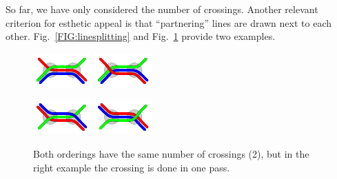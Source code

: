 \documentclass{llncs}
\begin{document}
So far, we have only considered the number of crossings.
Another relevant criterion for esthetic appeal is that ``partnering'' lines are drawn next to each other.
Fig.~\ref{FIG:linesplitting} and Fig.~\ref{FIG:linesplitting2} provide two examples.
%
\begin{figure}[t]
\centering
\begin{minipage}{.48\textwidth}
  \centering
	\includegraphics[trim={2.25 0 2.25 0},clip,angle=270,origin=c,width=.25\textwidth]{render_examples/splitting_example_nonopt.pdf}\hspace{19pt}
	\includegraphics[trim={2.25 0 2.25 0},clip,angle=270,origin=c,width=.25\textwidth]{render_examples/splitting_example.pdf}
	\caption{Crossings are minimized in the left example (1), but the right example with 2 crossings better indicates line pairings.}
	\label{FIG:linesplitting}
\end{minipage}%
\hfill
\begin{minipage}{.48\textwidth}
  \centering
	\includegraphics[trim={2.25 0 2.25 0},clip,angle=90,origin=c,width=.25\textwidth]{render_examples/splitting_example2_nonopt.pdf}\hspace{19pt}
	\includegraphics[trim={2.25 0 2.25 0},clip,angle=90,origin=c,width=.25\textwidth]{render_examples/splitting_example2.pdf}
	\caption{Both orderings have the same number of crossings (2), but in the right example the
crossing is done in one pass.}
	\label{FIG:linesplitting2}
\end{minipage}
\end{figure}
\end{document}

